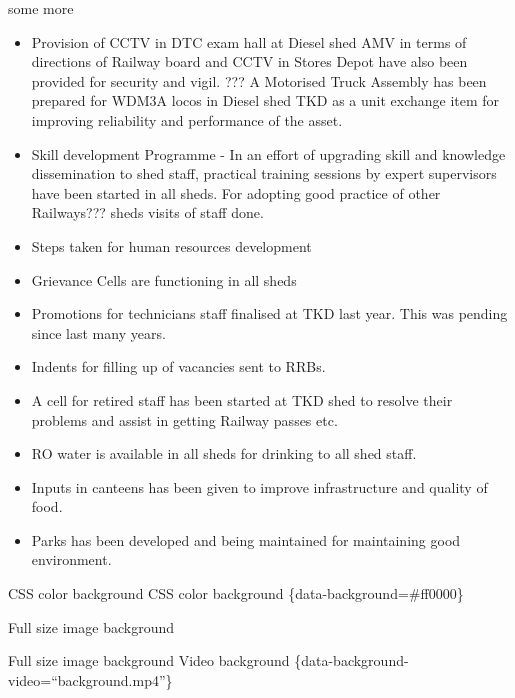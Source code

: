 \documentclass[
  ignorenonframetext,
]{beamer}
\providecommand{\tightlist}{%
  \setlength{\itemsep}{0pt}\setlength{\parskip}{0pt}}
\begin{document}
\begin{frame}{some more}
\protect\hypertarget{some-more}{}
\begin{itemize}[<+->]
\tightlist
\item
  Provision of CCTV in DTC exam hall at Diesel shed AMV in terms of
  directions of Railway board and CCTV in Stores Depot have also been
  provided for security and vigil. ??? A Motorised Truck Assembly has
  been prepared for WDM3A locos in Diesel shed TKD as a unit exchange
  item for improving reliability and performance of the asset.
\item
  Skill development Programme - In an effort of upgrading skill and
  knowledge dissemination to shed staff, practical training sessions by
  expert supervisors have been started in all sheds. For adopting good
  practice of other Railways??? sheds visits of staff done.
\item
  Steps taken for human resources development
\item
  Grievance Cells are functioning in all sheds
\item
  Promotions for technicians staff finalised at TKD last year. This was
  pending since last many years.
\item
  Indents for filling up of vacancies sent to RRBs.
\item
  A cell for retired staff has been started at TKD shed to resolve their
  problems and assist in getting Railway passes etc.
\item
  RO water is available in all sheds for drinking to all shed staff.
\item
  Inputs in canteens has been given to improve infrastructure and
  quality of food.
\item
  Parks has been developed and being maintained for maintaining good
  environment.
\end{itemize}
\end{frame}

\begin{frame}{CSS color background}
\protect\hypertarget{css-color-background}{}
CSS color background \{data-background=\#ff0000\}
\end{frame}

\begin{frame}{Full size image background}
\protect\hypertarget{full-size-image-background}{}
\begin{block}{Full size image background}
\protect\hypertarget{full-size-image-background-1}{}
Video background \{data-background-video=``background.mp4''\}
\end{block}
\end{frame}
\end{document}
